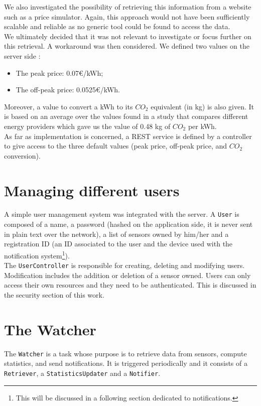\documentclass[a4paper, oneside, 11pt]{book}
\begin{document}
We also investigated the possibility of retrieving this information from a website such as a price simulator. Again, this approach would not have been sufficiently scalable and reliable as no generic tool could be found to access the data. \\

We ultimately decided that it was not relevant to investigate or focus further on this retrieval. A workaround was then considered. We defined two values on the server side \cite{levver:online}:
\begin{itemize}	
	\item The peak price:  0.07\euro/kWh;
	\item The off-peak price: 0.0525\euro/kWh.
\end{itemize}

Moreover, a value to convert a kWh to its \(CO_2\) equivalent (in kg) is also given. It is based on an average over the values found in a study \cite{bluesky:online} that compares different energy providers which gave us the value of 0.48 kg of \(CO_2\) per kWh.\\
			
As far as implementation is concerned, a REST service is defined by a controller to give access to the three default values (peak price, off-peak price, and \(CO_2\) conversion).

\section{Managing different users}
A simple user management system was integrated with the server. A \texttt{User} is composed of a name, a password (hashed on the application side, it is never sent in plain text over the network), a list of sensors owned by him/her and a registration ID (an ID associated to the user and the device used with the notification system\footnote{This will be discussed in a following section dedicated to notifications.}).\\

The \texttt{UserController} is responsible for creating, deleting and modifying users. Modification includes the addition or deletion of a sensor owned. Users can only access their own resources and they need to be authenticated. This is discussed in the security section of this work.

\section{The Watcher}
The \texttt{Watcher} is a task whose purpose is to retrieve data from sensors, compute statistics, and send notifications. It is triggered periodically and it consists of a \texttt{Retriever}, a \texttt{StatisticsUpdater} and a \texttt{Notifier}.
\end{document}
